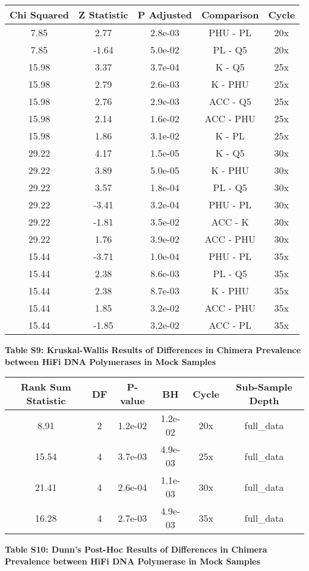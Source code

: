 \documentclass[12pt,]{article}
\begin{document}
\begin{longtable}[]{@{}ccccc@{}}
\toprule
Chi Squared & Z Statistic & P Adjusted & Comparison &
Cycle\tabularnewline
\midrule
\endhead
7.85 & 2.77 & 2.8e-03 & PHU - PL & 20x\tabularnewline
7.85 & -1.64 & 5.0e-02 & PL - Q5 & 20x\tabularnewline
15.98 & 3.37 & 3.7e-04 & K - Q5 & 25x\tabularnewline
15.98 & 2.79 & 2.6e-03 & K - PHU & 25x\tabularnewline
15.98 & 2.76 & 2.9e-03 & ACC - Q5 & 25x\tabularnewline
15.98 & 2.14 & 1.6e-02 & ACC - PHU & 25x\tabularnewline
15.98 & 1.86 & 3.1e-02 & K - PL & 25x\tabularnewline
29.22 & 4.17 & 1.5e-05 & K - Q5 & 30x\tabularnewline
29.22 & 3.89 & 5.0e-05 & K - PHU & 30x\tabularnewline
29.22 & 3.57 & 1.8e-04 & PL - Q5 & 30x\tabularnewline
29.22 & -3.41 & 3.2e-04 & PHU - PL & 30x\tabularnewline
29.22 & -1.81 & 3.5e-02 & ACC - K & 30x\tabularnewline
29.22 & 1.76 & 3.9e-02 & ACC - PHU & 30x\tabularnewline
15.44 & -3.71 & 1.0e-04 & PHU - PL & 35x\tabularnewline
15.44 & 2.38 & 8.6e-03 & PL - Q5 & 35x\tabularnewline
15.44 & 2.38 & 8.7e-03 & K - PHU & 35x\tabularnewline
15.44 & 1.85 & 3.2e-02 & ACC - PHU & 35x\tabularnewline
15.44 & -1.85 & 3.2e-02 & ACC - PL & 35x\tabularnewline
\bottomrule
\end{longtable}

\newpage

\textbf{Table S9: Kruskal-Wallis Results of Differences in Chimera
Prevalence between HiFi DNA Polymerases in Mock Samples}

\begin{longtable}[]{@{}cccccc@{}}
\toprule
Rank Sum Statistic & DF & P-value & BH & Cycle & Sub-Sample
Depth\tabularnewline
\midrule
\endhead
8.91 & 2 & 1.2e-02 & 1.2e-02 & 20x & full\_data\tabularnewline
15.54 & 4 & 3.7e-03 & 4.9e-03 & 25x & full\_data\tabularnewline
21.41 & 4 & 2.6e-04 & 1.1e-03 & 30x & full\_data\tabularnewline
16.28 & 4 & 2.7e-03 & 4.9e-03 & 35x & full\_data\tabularnewline
\bottomrule
\end{longtable}

\newpage

\textbf{Table S10: Dunn's Post-Hoc Results of Differences in Chimera
Prevalence between HiFi DNA Polymerase in Mock Samples}
\end{document}
